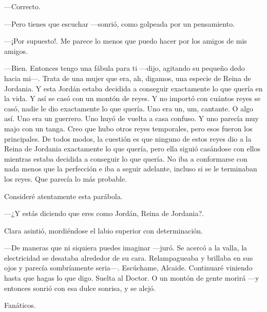 ---Correcto.

---Pero tienes que escuchar ---sonrió, como golpeada por un pensamiento.

---¡Por supuesto!. Me parece lo menos que puedo hacer por los amigos de
mis amigos.

---Bien. Entonces tengo una fábula para ti ---dijo, agitando su pequeño
dedo hacia mi---. Trata de una mujer que era, ah, digamos, una especie
de Reina de Jordania. Y esta Jordán estaba decidida a conseguir
exactamente lo que quería en la vida. Y así se casó con un montón de
reyes. Y no importó con cuántos reyes se casó, nadie le dio exactamente
lo que quería. Uno era un, um, cantante. O algo así. Uno era un
guerrero. Uno huyó de vuelta a casa confuso. Y uno parecía muy majo con
un tanga. Creo que hubo otros reyes temporales, pero esos fueron los
principales. De todos modos, la cuestión es que ninguno de estos reyes
dio a la Reina de Jordania exactamente lo que quería, pero ella siguió
casándose con ellos mientras estaba decidida a conseguir lo que quería.
No iba a conformarse con nada menos que la perfección e iba a seguir
adelante, incluso si se le terminaban los reyes. Que parecía lo más
probable.

Consideré atentamente esta parábola.

---¿Y estás diciendo que eres como Jordán, Reina de Jordania?.

Clara asintió, mordiéndose el labio superior con determinación.

---De maneras que ni siquiera puedes imaginar ---juró. Se acercó a la
valla, la electricidad se desataba alrededor de su cara. Relampagueaba y
brillaba en sus ojos y parecía sombríamente seria---. Escúchame,
Alcaide. Continuaré viniendo hasta que hagas lo que digo. Suelta al
Doctor. O un montón de gente morirá ---y entonces sonrió con esa dulce
sonrisa, y se alejó.

Fanáticos.

